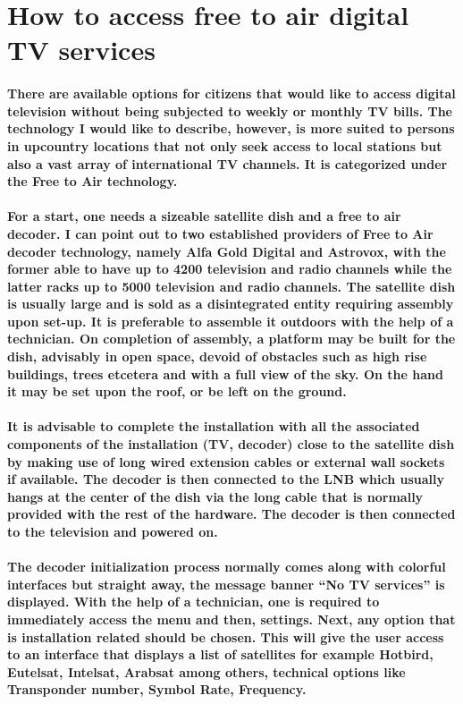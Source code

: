 \documentclass[a4paper,10pt]{report}
\begin{document}
\section{How to access free to air digital TV services}
\paragraph{There are available options for citizens that would like to access digital television without being subjected to weekly or monthly TV bills. The technology I would like to describe, however, is more suited to persons in upcountry locations that not only seek access to local stations but also a vast array of international TV channels. It is categorized under the Free to Air technology.}
\paragraph{ For a start, one needs a sizeable satellite dish and a free to air decoder. I can point out to two established providers of Free to Air decoder technology, namely Alfa Gold Digital and Astrovox, with the former able to have up to 4200 television and radio channels while the latter racks up to 5000 television and radio channels.
The satellite dish is usually large and is sold as a disintegrated entity requiring assembly upon set-up. It is preferable to assemble it outdoors with the help of a technician. On completion of assembly, a platform may be built for the dish, advisably in open space, devoid of obstacles such as high rise buildings, trees etcetera and with a full view of the sky. On the hand it may be set upon the roof, or be left on the ground.}
\paragraph{It is advisable to complete the installation with all the associated components of the installation (TV, decoder) close to the satellite dish by making use of long wired extension cables or external wall sockets if available. The decoder is then connected to the LNB which usually hangs at the center of the dish via the long cable that is normally provided with the rest of the hardware. The decoder is then connected to the television and powered on.}
\paragraph{The decoder initialization process normally comes along with colorful interfaces but straight away, the message banner “No TV services” is displayed. With the help of a technician, one is required to immediately access the menu and then, settings. Next, any option that is installation related should be chosen. This will give the user access to an interface that displays a list of satellites for example Hotbird, Eutelsat, Intelsat, Arabsat among others, technical options like Transponder number, Symbol Rate, Frequency.}
\end{document}

